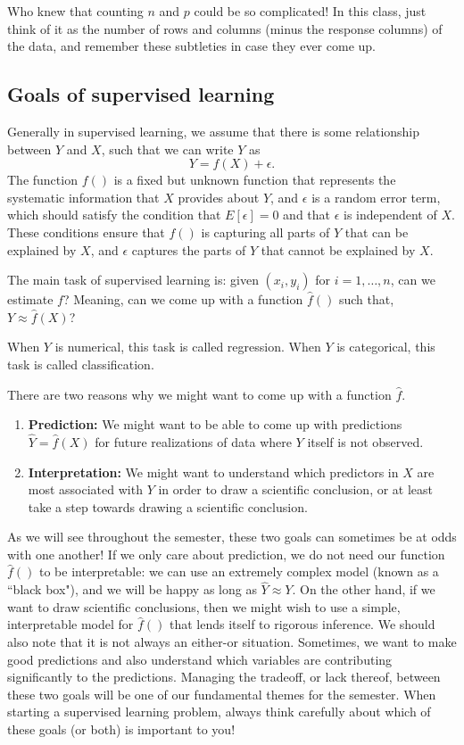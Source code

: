 Who knew that counting $n$ and $p$ could be so complicated! In this class, just think of it as the number of rows and columns (minus the response columns) of the data, and remember these subtleties in case they ever come up. \\

\subsection{Goals of supervised learning}

Generally in supervised learning, we assume that there is some relationship between $Y$ and $X$, such that we can write $Y$ as
$$
Y = f(X)+\epsilon.
$$
The function $f()$ is a fixed but unknown function that represents the systematic information that $X$ provides about $Y$, and $\epsilon$ is a random error term, which should satisfy the condition that $E[\epsilon] = 0$ and that $\epsilon$ is independent of $X$. These conditions ensure that $f()$ is capturing all parts of $Y$ that can be explained by $X$, and $\epsilon$ captures the parts of $Y$ that cannot be explained by $X$. 

The main task of supervised learning is: given $(x_i,y_i)$ for $i = 1,\ldots,n$, can we estimate $f$? Meaning, can we come up with a function $\hat{f}()$ such that, $Y \approx \hat{f}(X)$? 

When $Y$ is numerical, this task is called regression. When $Y$ is categorical, this task is called classification. 

There are two reasons why we might want to come up with a function $\hat{f}$.
\begin{enumerate}
\item \textbf{Prediction:} We might want to be able to come up with predictions 	$\hat{Y} = \hat{f}(X)$ for future realizations of data where $Y$ itself is not observed.
\item \textbf{Interpretation:} We might want to understand which predictors in $X$ are most associated with $Y$ in order to draw a scientific conclusion, or at least take a step towards drawing a scientific conclusion. 
\end{enumerate}
As we will see throughout the semester, these two goals can sometimes be at odds with one another! If we only care about prediction, we do not need our function $\hat{f}()$ to be interpretable: we can use an extremely complex model (known as a ``black box"), and we will be happy as long as $\hat{Y} \approx Y$. On the other hand, if we want to draw scientific conclusions, then we might wish to use a simple, interpretable model for $\hat{f}()$ that lends itself to rigorous inference. We should also note that it is not always an either-or situation. Sometimes, we want to make good predictions and also understand which variables are contributing significantly to the predictions. Managing the tradeoff, or lack thereof, between these two goals will be one of our fundamental themes for the semester. When starting a supervised learning problem, always think carefully about which of these goals (or both) is important to you! 

